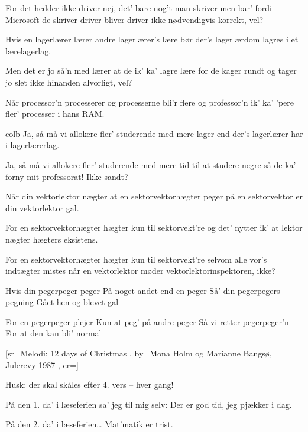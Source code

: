 \documentclass[pdftex,12pt]{article}
\begin{document}
\begin{songs}{}
\endverse
\beginverse
For det hedder ikke driver
nej, det' bare nog't man skriver
men bar' fordi Microsoft de skriver
driver bliver driver ikke nødvendigvis korrekt, vel?

\endverse
\beginverse
Hvis en lagerlærer lærer
andre lagerlærer's lære
bør der's lagerlærdom lagres
i et lærelagerlag.

\endverse
\beginverse
Men det er jo så'n med lærer
at de ik' ka' lagre lære
for de kager rundt og tager
jo slet ikke hinanden alvorligt, vel?

\endverse
\beginverse
Når processor'n processerer
og processerne bli'r flere
og professor'n ik' ka' 'pere
fler' processer i hans RAM.

\endverse
\beginverse
{colb}
Ja, så må vi allokere
fler' studerende med mere
lager end der's lagerlærer
har i lagerlærerlag.

\endverse
\beginverse
Ja, så må vi allokere
fler' studerende med mere
tid til at studere negre
så de ka' forny mit professorat! Ikke sandt?

\endverse
\beginverse
Når din vektorlektor nægter
at en sektorvektorhægter
peger på en sektorvektor
er din vektorlektor gal.

\endverse
\beginverse
For en sektorvektorhægter
hægter kun til sektorvekt're
og det' nytter ik' at lektor
nægter hægters eksistens.

\endverse
\beginverse
For en sektorvektorhægter
hægter kun til sektorvekt're
selvom alle vor's indtægter
mistes når en vektorlektor møder vektorlektorinspektoren, ikke?

\endverse
\beginverse
Hvis din pegerpeger peger
På noget andet end en peger
Så' din pegerpegers pegning
Gået hen og blevet gal

\endverse
\beginverse
For en pegerpeger plejer
Kun at peg' på andre peger
Så vi retter pegerpeger'n
For at den kan bli' normal

\endverse
\endsong



﻿[sr={Melodi: 12 days of Christmas}
,
by={Mona Holm og Marianne Bangsø, Julerevy 1987}
,
cr={}]\hypertarget{Tål daj i læseferien}{}
\label{song33}

\beginverse
Husk: der skal skåles efter 4. vers -- hver gang!
\endverse

\beginverse
På den 1. da’ i læseferien sa’ jeg til mig selv:
Der er god tid, jeg pjækker i dag.
\endverse

\beginverse
På den 2. da’ i læseferien\ldots
Mat’matik er trist.
\endverse


\end{songs}
\end{document}
